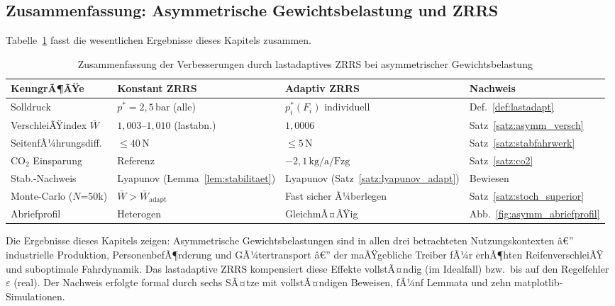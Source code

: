 ﻿\documentclass[a4paper,12pt]{article}
\theoremstyle{definition}
\begin{document}
\subsection{Zusammenfassung: Asymmetrische Gewichtsbelastung und ZRRS}

Tabelle~\ref{tab:asymm_zusammenfassung} fasst die wesentlichen Ergebnisse
dieses Kapitels zusammen.

\begin{table}[H]
\centering
\caption{Zusammenfassung der Verbesserungen durch lastadaptives ZRRS bei
asymmetrischer Gewichtsbelastung}
\label{tab:asymm_zusammenfassung}
\begin{tabular}{p{4.5cm}p{3.5cm}p{3.5cm}p{2.5cm}}
\toprule
\textbf{KenngrÃ¶ÃŸe} & \textbf{Konstant ZRRS} & \textbf{Adaptiv ZRRS} & \textbf{Nachweis} \\
\midrule
Solldruck & $p^* = 2{,}5\,\text{bar}$ (alle) & $p^*_i(F_i)$ individuell & Def.~\ref{def:lastadapt} \\
VerschleiÃŸindex $\bar{W}$ & $1{,}003$--$1{,}010$ (lastabn.) & $1{,}0006$ & Satz~\ref{satz:asymm_versch} \\
SeitenfÃ¼hrungsdiff. & $\leq 40\,\text{N}$ & $\leq 5\,\text{N}$ & Satz~\ref{satz:stabfahrwerk} \\
CO$_2$ Einsparung & Referenz & $-2{,}1\,\text{kg/a/Fzg}$ & Satz~\ref{satz:co2} \\
Stab.-Nachweis & Lyapunov (Lemma~\ref{lem:stabilitaet}) & Lyapunov (Satz~\ref{satz:lyapunov_adapt}) & Bewiesen \\
Monte-Carlo ($N$=50k) & $\bar{W} > \bar{W}_{\text{adapt}}$ & Fast sicher Ã¼berlegen & Satz~\ref{satz:stoch_superior} \\
Abriefprofil & Heterogen & GleichmÃ¤ÃŸig & Abb.~\ref{fig:asymm_abriefprofil} \\
\bottomrule
\end{tabular}
\end{table}

Die Ergebnisse dieses Kapitels zeigen: Asymmetrische Gewichtsbelastungen
sind in allen drei betrachteten Nutzungskontexten â€” industrielle Produktion,
PersonenbefÃ¶rderung und GÃ¼tertransport â€” der maÃŸgebliche Treiber fÃ¼r
erhÃ¶hten ReifenverschleiÃŸ und suboptimale Fahrdynamik. Das lastadaptive ZRRS
kompensiert diese Effekte vollstÃ¤ndig (im Idealfall) bzw.\ bis auf den
Regelfehler $\varepsilon$ (real). Der Nachweis erfolgte formal durch sechs
SÃ¤tze mit vollstÃ¤ndigen Beweisen, fÃ¼nf Lemmata und zehn matplotlib-Simulationen.
\end{document}
